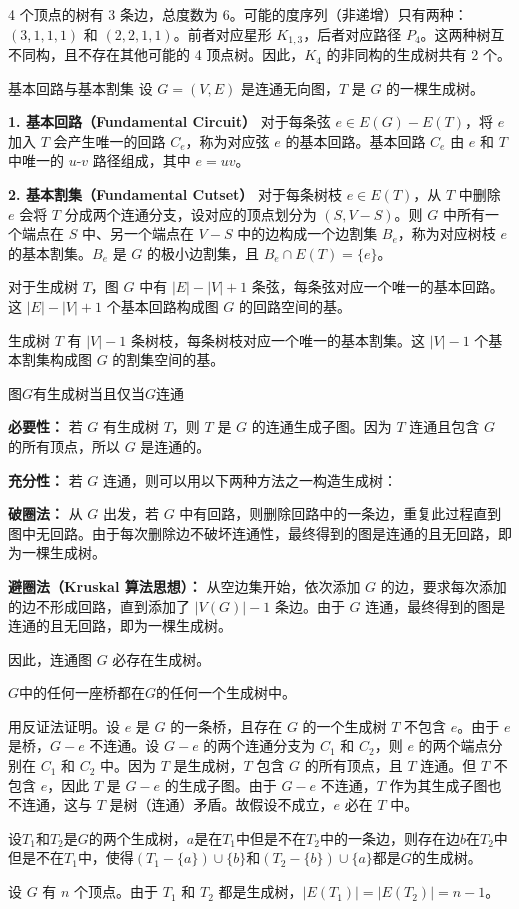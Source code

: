 4 个顶点的树有 3 条边，总度数为 6。可能的度序列（非递增）只有两种：$(3,1,1,1)$ 和 $(2,2,1,1)$。前者对应星形 $K_{1,3}$，后者对应路径 $P_4$。这两种树互不同构，且不存在其他可能的 4 顶点树。因此，$K_4$ 的非同构的生成树共有 2 个。
\begin{definition}{基本回路与基本割集}{}
设 $G=(V,E)$ 是连通无向图，$T$ 是 $G$ 的一棵生成树。

\textbf{1. 基本回路（Fundamental Circuit）}
对于每条弦 $e \in E(G)- E(T)$，将 $e$ 加入 $T$ 会产生唯一的回路 $C_e$，称为对应弦 $e$ 的基本回路。基本回路 $C_e$ 由 $e$ 和 $T$ 中唯一的 $u$-$v$ 路径组成，其中 $e=uv$。

\textbf{2. 基本割集（Fundamental Cutset）}
对于每条树枝 $e \in E(T)$，从 $T$ 中删除 $e$ 会将 $T$ 分成两个连通分支，设对应的顶点划分为 $(S, V- S)$。则 $G$ 中所有一个端点在 $S$ 中、另一个端点在 $V-S$ 中的边构成一个边割集 $B_e$，称为对应树枝 $e$ 的基本割集。$B_e$ 是 $G$ 的极小边割集，且 $B_e \cap E(T) = \{e\}$。
\end{definition}
对于生成树 $T$，图 $G$ 中有 $|E|-|V|+1$ 条弦，每条弦对应一个唯一的基本回路。这 $|E|-|V|+1$ 个基本回路构成图 $G$ 的回路空间的基。

生成树 $T$ 有 $|V|-1$ 条树枝，每条树枝对应一个唯一的基本割集。这 $|V|-1$ 个基本割集构成图 $G$ 的割集空间的基。
\begin{theorem}{}{}
图$G$有生成树当且仅当$G$连通
\end{theorem}
\textbf{必要性：} 若 $G$ 有生成树 $T$，则 $T$ 是 $G$ 的连通生成子图。因为 $T$ 连通且包含 $G$ 的所有顶点，所以 $G$ 是连通的。

    \textbf{充分性：} 若 $G$ 连通，则可以用以下两种方法之一构造生成树：
    
    \textbf{破圈法：} 从 $G$ 出发，若 $G$ 中有回路，则删除回路中的一条边，重复此过程直到图中无回路。由于每次删除边不破坏连通性，最终得到的图是连通的且无回路，即为一棵生成树。
    
    \textbf{避圈法（Kruskal 算法思想）：} 从空边集开始，依次添加 $G$ 的边，要求每次添加的边不形成回路，直到添加了 $|V(G)|-1$ 条边。由于 $G$ 连通，最终得到的图是连通的且无回路，即为一棵生成树。

    因此，连通图 $G$ 必存在生成树。
\begin{theorem}{}{}
$G$中的任何一座桥都在$G$的任何一个生成树中。
\end{theorem}
用反证法证明。设 $e$ 是 $G$ 的一条桥，且存在 $G$ 的一个生成树 $T$ 不包含 $e$。由于 $e$ 是桥，$G-e$ 不连通。设 $G-e$ 的两个连通分支为 $C_1$ 和 $C_2$，则 $e$ 的两个端点分别在 $C_1$ 和 $C_2$ 中。因为 $T$ 是生成树，$T$ 包含 $G$ 的所有顶点，且 $T$ 连通。但 $T$ 不包含 $e$，因此 $T$ 是 $G-e$ 的生成子图。由于 $G-e$ 不连通，$T$ 作为其生成子图也不连通，这与 $T$ 是树（连通）矛盾。故假设不成立，$e$ 必在 $T$ 中。
\begin{theorem}{}{}
设$T_1$和$T_2$是$G$的两个生成树，$a$是在$T_1$中但是不在$T_2$中的一条边，则存在边$b$在$T_2$中但是不在$T_1$中，使得$(T_1-\{a\})\cup\{b\}$和$(T_2-\{b\})\cup\{a\}$都是$G$的生成树。
\end{theorem}
设 $G$ 有 $n$ 个顶点。由于 $T_1$ 和 $T_2$ 都是生成树，$|E(T_1)|=|E(T_2)|=n-1$。

